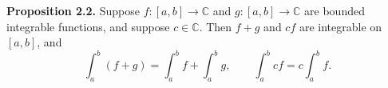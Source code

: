 \textbf{Proposition 2.2.} Suppose $f: [a, b] \to \mathbb{C}$ and $g: [a, b] \to \mathbb{C}$ are bounded integrable functions, and suppose $c \in \mathbb{C}$. Then $f + g$ and $cf$ are integrable on $[a, b]$, and
$$\int_a^b (f + g) = \int_a^b f + \int_a^b g, \qquad \int_a^b cf = c \int_a^b f.$$
